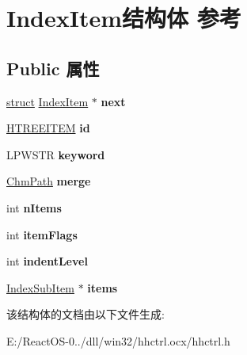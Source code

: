 \hypertarget{struct_index_item}{}\section{Index\+Item结构体 参考}
\label{struct_index_item}
\subsection*{Public 属性}
\begin{DoxyCompactItemize}
\item 
\mbox{\label{struct_index_item_a3f894129590b658063407d70e93a4822}} 
\hyperlink{interfacestruct}{struct} \hyperlink{struct_index_item}{Index\+Item} $\ast$ {\bfseries next}
\item 
\mbox{\label{struct_index_item_a3d41be152626a7f6da6df52455875286}} 
\hyperlink{struct___t_r_e_e_i_t_e_m}{H\+T\+R\+E\+E\+I\+T\+EM} {\bfseries id}
\item 
\mbox{\label{struct_index_item_aff015f23e5809636b92567101bd07182}} 
L\+P\+W\+S\+TR {\bfseries keyword}
\item 
\mbox{\label{struct_index_item_a8b37ef9ef611d065459cd15578b98115}} 
\hyperlink{struct_chm_path}{Chm\+Path} {\bfseries merge}
\item 
\mbox{\label{struct_index_item_a21d38ad137d6cecb48c37928c9fbbe71}} 
int {\bfseries n\+Items}
\item 
\mbox{\label{struct_index_item_a102af948501f42ff04e1a65365fba6b0}} 
int {\bfseries item\+Flags}
\item 
\mbox{\label{struct_index_item_ae7327bd89353996fab15a72150288454}} 
int {\bfseries indent\+Level}
\item 
\mbox{\label{struct_index_item_a2417fc1b1134a0afc21ac6f3e13e4804}} 
\hyperlink{struct_index_sub_item}{Index\+Sub\+Item} $\ast$ {\bfseries items}
\end{DoxyCompactItemize}


该结构体的文档由以下文件生成\+:\begin{DoxyCompactItemize}
\item 
E\+:/\+React\+O\+S-\/0../dll/win32/hhctrl.\+ocx/hhctrl.\+h\end{DoxyCompactItemize}
